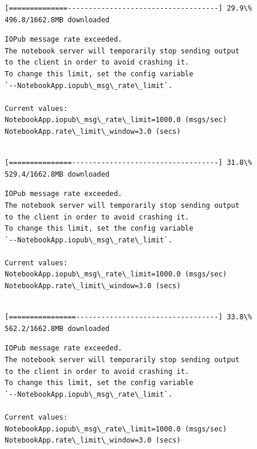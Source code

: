 \documentclass[11pt]{article}
\begin{document}
    \begin{Verbatim}[commandchars=\\\{\}]
[==============------------------------------------] 29.9\% 496.8/1662.8MB downloaded
    \end{Verbatim}

    \begin{Verbatim}[commandchars=\\\{\}]
IOPub message rate exceeded.
The notebook server will temporarily stop sending output
to the client in order to avoid crashing it.
To change this limit, set the config variable
`--NotebookApp.iopub\_msg\_rate\_limit`.

Current values:
NotebookApp.iopub\_msg\_rate\_limit=1000.0 (msgs/sec)
NotebookApp.rate\_limit\_window=3.0 (secs)


    \end{Verbatim}

    \begin{Verbatim}[commandchars=\\\{\}]
[===============-----------------------------------] 31.8\% 529.4/1662.8MB downloaded
    \end{Verbatim}

    \begin{Verbatim}[commandchars=\\\{\}]
IOPub message rate exceeded.
The notebook server will temporarily stop sending output
to the client in order to avoid crashing it.
To change this limit, set the config variable
`--NotebookApp.iopub\_msg\_rate\_limit`.

Current values:
NotebookApp.iopub\_msg\_rate\_limit=1000.0 (msgs/sec)
NotebookApp.rate\_limit\_window=3.0 (secs)


    \end{Verbatim}

    \begin{Verbatim}[commandchars=\\\{\}]
[================----------------------------------] 33.8\% 562.2/1662.8MB downloaded
    \end{Verbatim}

    \begin{Verbatim}[commandchars=\\\{\}]
IOPub message rate exceeded.
The notebook server will temporarily stop sending output
to the client in order to avoid crashing it.
To change this limit, set the config variable
`--NotebookApp.iopub\_msg\_rate\_limit`.

Current values:
NotebookApp.iopub\_msg\_rate\_limit=1000.0 (msgs/sec)
NotebookApp.rate\_limit\_window=3.0 (secs)


    \end{Verbatim}
\end{document}
